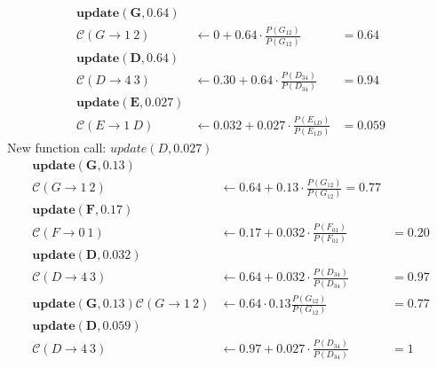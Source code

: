 \documentclass{article}
\newcommand{\C}{\mathcal{C}}
\begin{document}
\begin{align*}
\mathbf{update(G,0.64)}\\
\C(G\rightarrow 1~2) &\leftarrow 0 + 0.64 \cdot \frac{P(G_{12})}{P(G_{12})} &= 0.64\\
\mathbf{update(D,0.64)}\\
\C(D\rightarrow 4~3) &\leftarrow 0.30 + 0.64\cdot \frac{P(D_{34})}{P(D_{34})} &= 0.94\\
\mathbf{update(E,0.027)}\\
\C(E\rightarrow 1~D) &\leftarrow 0.032 + 0.027\cdot \frac{P(E_{1D})}{P(E_{1D})} &= 0.059
\end{align*}
New function call: $update(D,0.027)$
\begin{align*}
\mathbf{update(G,0.13)}\\
\C(G\rightarrow 1~2) &\leftarrow 0.64 + 0.13 \cdot \frac{P(G_{12})}{P(G_{12})} = 0.77\\
\mathbf{update(F,0.17)}\\
\C(F\rightarrow 0~1) &\leftarrow 0.17 + 0.032\cdot \frac{P(F_{01})}{P(F_{01})} &= 0.20\\
\mathbf{update(D,0.032)}\\
\C(D\rightarrow 4~3) &\leftarrow 0.64 + 0.032\cdot \frac{P(D_{34})}{P(D_{34})} &= 0.97\\
\mathbf{update(G,0.13)}
\C(G\rightarrow 1~2) &\leftarrow  0.64 \cdot 0.13 \frac{P(G_{12})}{P(G_{12})} &= 0.77\\
\mathbf{update(D,0.059)}\\
\C(D\rightarrow 4~3) &\leftarrow 0.97 + 0.027\cdot \frac{P(D_{34})}{P(D_{34})} &= 1\\
\end{align*}
\end{document}
